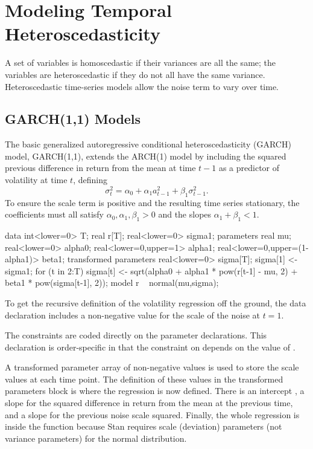 \section{Modeling Temporal Heteroscedasticity}

A set of variables is homoscedastic if their variances are all the
same; the variables are heteroscedastic if they do not all have the
same variance.  Heteroscedastic time-series models allow the noise
term to vary over time.

\subsection{GARCH(1,1) Models}

The basic generalized autoregressive conditional heteroscedasticity
(GARCH) model, GARCH(1,1), extends the ARCH(1) model by including the
squared previous difference in return from the mean at time $t-1$ as a
predictor of volatility at time $t$, defining
%
\[
\sigma^2_t = \alpha_0 + \alpha_1 a^2_{t-1} + \beta_1 \sigma^2_{t-1}.
\]
%
To ensure the scale term is positive and the resulting time series
stationary, the coefficients must all satisfy $\alpha_0, \alpha_1,
\beta_1 > 0$ and the slopes $\alpha_1 + \beta_1 < 1$.
%
\begin{stancode}
data {
  int<lower=0> T; 
  real r[T];
  real<lower=0> sigma1; 
}
parameters {
  real mu; 
  real<lower=0> alpha0;          
  real<lower=0,upper=1> alpha1;  
  real<lower=0,upper=(1-alpha1)> beta1; 
}
transformed parameters {
  real<lower=0> sigma[T];
  sigma[1] <- sigma1;
  for (t in 2:T)
    sigma[t] <- sqrt(alpha0 
                     + alpha1 * pow(r[t-1] - mu, 2)
                     + beta1 * pow(sigma[t-1], 2));
}
model {
  r ~ normal(mu,sigma);
}
\end{stancode}
%
To get the recursive definition of the volatility regression off the
ground, the data declaration includes a non-negative value 
 for the scale of the noise at $t = 1$. 

The constraints are coded directly on the parameter declarations.
This declaration is order-specific in that the constraint on 
depends on the value of . 

A transformed parameter array of non-negative values  is
used to store the scale values at each time point.  The definition of
these values in the transformed parameters block is where the
regression is now defined.  There is an intercept , a
slope  for the squared difference in return from the mean
at the previous time, and a slope  for the previous noise
scale squared.  Finally, the whole regression is inside the
 function because Stan requires scale (deviation) parameters (not
variance parameters) for the normal distribution.

